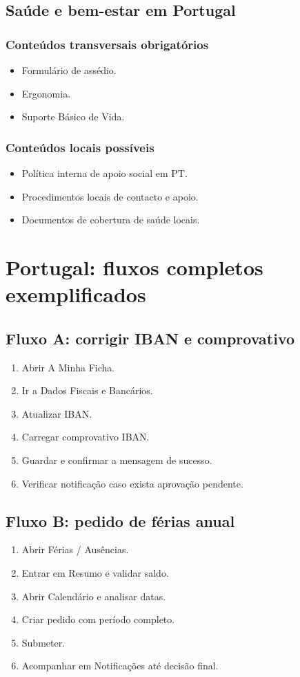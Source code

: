 \section{Saúde e bem-estar em Portugal}
\subsection{Conteúdos transversais obrigatórios}
\begin{itemize}
  \item Formulário de assédio.
  \item Ergonomia.
  \item Suporte Básico de Vida.
\end{itemize}

\subsection{Conteúdos locais possíveis}
\begin{itemize}
  \item Política interna de apoio social em PT.
  \item Procedimentos locais de contacto e apoio.
  \item Documentos de cobertura de saúde locais.
\end{itemize}

\chapter{Portugal: fluxos completos exemplificados}
\section{Fluxo A: corrigir IBAN e comprovativo}
\begin{enumerate}
  \item Abrir A Minha Ficha.
  \item Ir a Dados Fiscais e Bancários.
  \item Atualizar IBAN.
  \item Carregar comprovativo IBAN.
  \item Guardar e confirmar a mensagem de sucesso.
  \item Verificar notificação caso exista aprovação pendente.
\end{enumerate}

\section{Fluxo B: pedido de férias anual}
\begin{enumerate}
  \item Abrir Férias / Ausências.
  \item Entrar em Resumo e validar saldo.
  \item Abrir Calendário e analisar datas.
  \item Criar pedido com período completo.
  \item Submeter.
  \item Acompanhar em Notificações até decisão final.
\end{enumerate}

